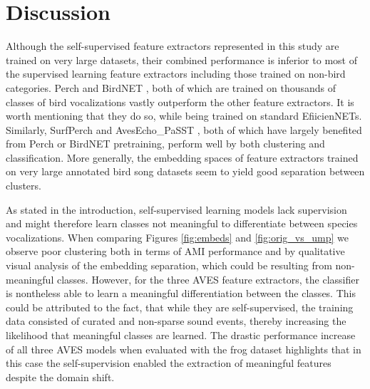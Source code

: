 \section{Discussion}
\label{sec:discussion}

Although the self-supervised feature extractors represented in this study are trained on very large datasets, their combined performance is inferior to most of the supervised learning feature extractors including those trained on non-bird categories.
Perch and BirdNET \cite{kahl_birdnet_2021}, both of which are trained on thousands of classes of bird vocalizations vastly outperform the other feature extractors. 
It is worth mentioning that they do so, while being trained on standard EfiicienNETs.
Similarly, SurfPerch \cite{williams_leveraging_2024} and AvesEcho\_PaSST \cite{ghani_generalization_2024}, both of which have largely benefited from Perch or BirdNET pretraining, perform well by both clustering and classification.
More generally, the embedding spaces of feature extractors trained on very large annotated bird song datasets seem to yield good separation between clusters.

As stated in the introduction, self-supervised learning models lack supervision and might therefore learn classes not meaningful to differentiate between species vocalizations.
When comparing Figures \ref{fig:embeds} and \ref{fig:orig_vs_ump} we observe poor clustering both in terms of AMI performance and by qualitative visual analysis of the embedding separation, which could be resulting from non-meaningful classes.
However, for the three AVES feature extractors, the classifier is nontheless able to learn a meaningful differentiation between the classes.
This could be attributed to the fact, that while they are self-supervised, the training data consisted of curated and non-sparse sound events, thereby increasing the likelihood that meaningful classes are learned.
The drastic performance increase of all three AVES models when evaluated with the frog dataset highlights that in this case the self-supervision enabled the extraction of meaningful features despite the domain shift.

